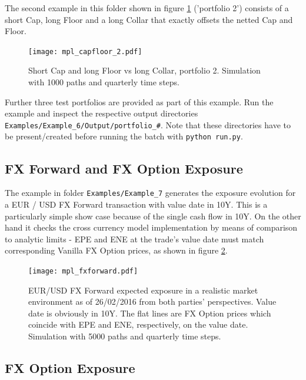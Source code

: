 \documentclass[12pt, a4paper]{article}
\begin{document}
The second example in this folder shown in figure \ref{fig_capfloor_2} ('portfolio 2') consists of a short Cap, long
Floor and a long Collar that exactly offsets the netted Cap and Floor.

\begin{figure}[h!]
\begin{center}
\texttt{[image: mpl\_capfloor\_2.pdf]}
\end{center}
\caption{Short Cap and long Floor vs long Collar, portfolio 2. Simulation with 1000 paths and quarterly time steps.}
\label{fig_capfloor_2}
\end{figure}

Further three test portfolios are provided as part of this example. Run the example and inspect the respective output
directories {\tt Examples/Example\_6/Output/portfolio\_\#}. Note that these directories have to be present/created
before running the batch with {\tt python run.py}.

\subsection{FX Forward and FX Option Exposure}\label{sec:fxfwd}

The example in folder {\tt Examples/Example\_7} generates the exposure evolution for a EUR / USD FX Forward transaction
with value date in 10Y. This is a particularly simple show case because of the single cash flow in 10Y. On the other
hand it checks the cross currency model implementation by means of comparison to analytic limits - EPE and ENE at the
trade's value date must match corresponding Vanilla FX Option prices, as shown in figure \ref{fig_5}.
\begin{figure}[h]
\begin{center}
\texttt{[image: mpl\_fxforward.pdf]}
\end{center}
\caption{EUR/USD FX Forward expected exposure in a realistic market environment as of 26/02/2016 from both parties'
  perspectives. Value date is obviously in 10Y. The flat lines are FX Option prices which coincide with EPE and ENE,
  respectively, on the value date. Simulation with 5000 paths and quarterly time steps.}
\label{fig_5}
\end{figure}

\subsection*{FX Option Exposure}\label{sec:fxoption}
\end{document}
